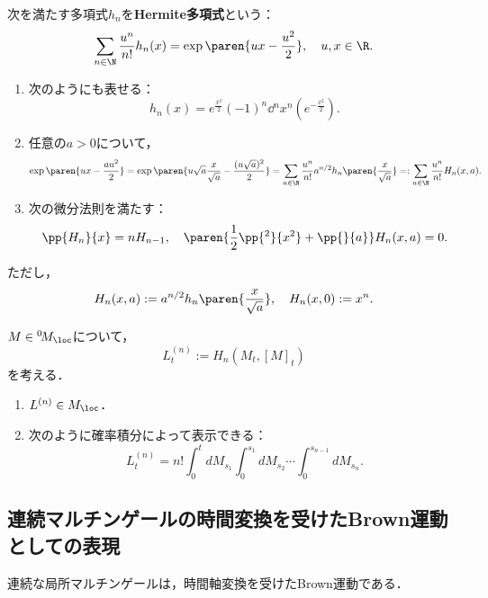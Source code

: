 \documentclass[uplatex,dvipdfmx]{jsreport}
\begin{document}
\begin{definition}
    次を満たす多項式$h_n$を\textbf{Hermite多項式}という：
    \[\sum_{n\in\N}\frac{u^n}{n!}h_n(x)=\exp\paren{ux-\frac{u^2}{2}},\quad u,x\in\R.\]
\end{definition}

\begin{lemma}\mbox{}
    \begin{enumerate}
        \item 次のようにも表せる：
        \[h_n(x)=e^{\frac{x^2}{2}}(-1)^n\dd{^n}{x^n}(e^{-\frac{x^2}{2}}).\]
        \item 任意の$a>0$について，
        \[\exp\paren{ux-\frac{au^2}{2}}=\exp\paren{u\sqrt{a}\frac{x}{\sqrt{a}}-\frac{(u\sqrt{a})^2}{2}}=\sum_{n\in\N}\frac{u^n}{n!}a^{n/2}h_n\paren{\frac{x}{\sqrt{a}}}=:\sum_{n\in\N}\frac{u^n}{n!}H_n(x,a).\]
        \item 次の微分法則を満たす：
        \[\pp{H_n}{x}=nH_{n-1},\quad\paren{\frac{1}{2}\pp{^2}{x^2}+\pp{}{a}}H_n(x,a)=0.\]
    \end{enumerate}
    ただし，
    \[H_n(x,a):=a^{n/2}h_n\paren{\frac{x}{\sqrt{a}}},\quad H_n(x,0):=x^n.\]
\end{lemma}

\begin{proposition}
    $M\in {}^0\!M_\loc$について，
    \[L^{(n)}_t:=H_n(M_t,[M]_t)\]
    を考える．
    \begin{enumerate}
        \item $L^{(n)}\in M_\loc$．
        \item 次のように確率積分によって表示できる：
        \[L^{(n)}_t=n!\int^t_0dM_{s_1}\int^{s_1}_0dM_{s_2}\cdots\int^{s_{n-1}}_0dM_{s_n}.\]
    \end{enumerate}
\end{proposition}

\subsection{連続マルチンゲールの時間変換を受けたBrown運動としての表現}

\begin{tcolorbox}[colframe=ForestGreen, colback=ForestGreen!10!white,breakable,colbacktitle=ForestGreen!40!white,coltitle=black,fonttitle=\bfseries\sffamily,
title=]
    連続な局所マルチンゲールは，時間軸変換を受けたBrown運動である．
\end{tcolorbox}
\end{document}
